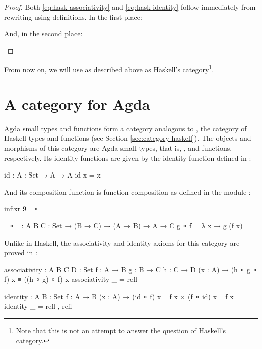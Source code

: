 \begin{proof}

  Both \eqref{eq:hask-associativity} and \eqref{eq:hask-identity}
  follow immediately from rewriting using definitions. In the first
  place:
  \begin{steps}
  \end{steps}
  And, in the second place:
  \begin{steps}
  \end{steps}

\end{proof}

From now on, we will use \hask as described above as Haskell's
category\footnote{Note that this is not an attempt to answer the
  question of Haskell's category.}.

\section{A category for Agda}
\label{sec:category-agda}

Agda small types and functions form a category analogous to \hask, the
category of Haskell types and functions (see Section
\ref{sec:category-haskell}). The objects and morphisms of this
category are Agda small types, that is, , and functions,
respectively. Its identity functions are given by the identity
function defined in :
\begin{codeagda}
id : {A : Set} → A → A
id x = x
\end{codeagda}
And its composition function is function composition as defined in the
module :
\begin{codeagda}
infixr 9 _∘_

_∘_ : {A B C : Set} → (B → C) → (A → B) → A → C
g ∘ f = λ x → g (f x)
\end{codeagda}
Unlike in Haskell, the associativity and identity axioms for this
category are proved in :
\begin{codeagda}
associativity : {A B C D : Set} {f : A → B} {g : B → C} {h : C → D}
                (x : A) → (h ∘ g ∘ f) x ≡ ((h ∘ g) ∘ f) x
associativity _ = refl

identity : {A B : Set} {f : A → B}
           (x : A) → (id ∘ f) x ≡ f x × (f ∘ id) x ≡ f x
identity _ = refl , refl
\end{codeagda}

